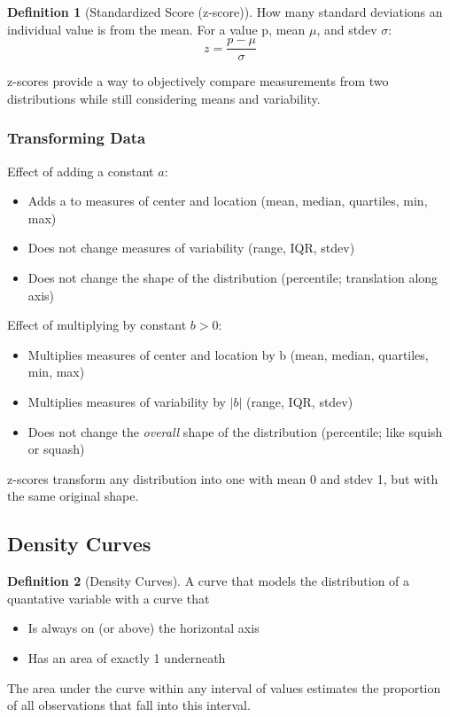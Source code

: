 \documentclass[12pt, a4paper]{article}
\theoremstyle{definition}
\newtheorem{definition}{Definition}
\begin{document}
\begin{definition}[Standardized Score (z-score)]
    How many standard deviations an individual value is from the mean. For a value p, mean $\mu$, and stdev $\sigma$:
    \[z = \frac{p - \mu}{\sigma}\]
\end{definition}

z-scores provide a way to objectively compare measurements from two distributions while still considering means and variability.

\subsubsection{Transforming Data}

Effect of adding a constant $a$:
\begin{itemize}
    \item Adds a to measures of center and location (mean, median, quartiles, min, max)
    \item Does not change measures of variability (range, IQR, stdev)
    \item Does not change the shape of the distribution (percentile; translation along axis)
\end{itemize}

Effect of multiplying by constant $b > 0$:
\begin{itemize}
    \item Multiplies measures of center and location by b (mean, median, quartiles, min, max)
    \item Multiplies measures of variability by $|b|$ (range, IQR, stdev)
    \item Does not change the \textit{overall} shape of the distribution (percentile; like squish or squash)
\end{itemize}

z-scores transform any distribution into one with mean 0 and stdev 1, but with the same original shape.

\subsection{Density Curves}
\begin{definition}[Density Curves]
    A curve that models the distribution of a quantative variable with a curve that
    \begin{itemize}
        \item Is always on (or above) the horizontal axis
        \item Has an area of exactly 1 underneath
    \end{itemize}
    The area under the curve within any interval of values estimates the proportion of all observations that fall into this interval.
\end{definition}
\end{document}
